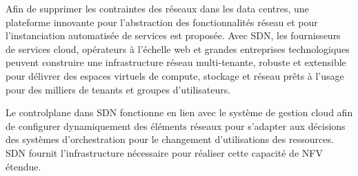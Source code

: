 Afin de supprimer les contraintes des réseaux dans les data centres, une plateforme innovante pour l'abstraction des fonctionnalités réseau et pour l'instanciation automatisée de services est proposée. Avec SDN, les fournisseurs de services cloud, opérateurs à l'échelle web et grandes entreprises technologiques peuvent construire une infrastructure réseau multi-tenante, robuste et extensible pour délivrer des espaces virtuels de compute, stockage et réseau prêts à l'usage pour des milliers de tenants et groupes d'utilisateurs.




Le \gls{controlplane} dans SDN fonctionne en lien avec le système de gestion cloud afin de configurer dynamiquement des éléments réseaux pour s'adapter aux décisions des systèmes d'orchestration pour le changement d'utilisations des ressources. SDN fournit l'infrastructure nécessaire pour réaliser cette capacité de NFV étendue.

